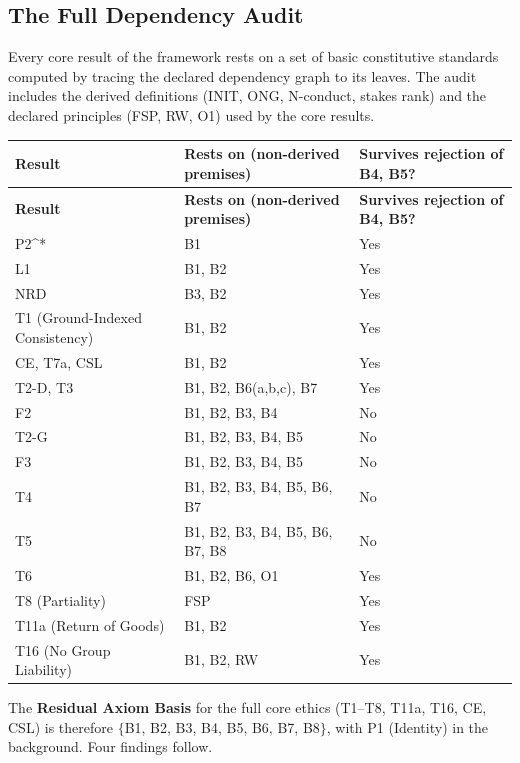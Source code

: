 \documentclass[11pt]{article}
\def\ensuremath#1{#1}%
\def\mathrm#1{#1}%
\newcommand{\Ptwo}{\texorpdfstring{\ensuremath{\mathrm{P2}^{*}}}{P2*}}
\begin{document}
\subsection{The Full Dependency Audit}\label{sec:rab:audit}
Every core result of the framework rests on a set of basic constitutive standards computed by tracing the declared dependency graph to its leaves. The audit includes the derived definitions (INIT, ONG, N-conduct, stakes rank) and the declared principles (FSP, RW, O1) used by the core results.
\begin{longtable}{@{}L{2.6cm} L{7.4cm} L{5.3cm}@{}}
\toprule
\textbf{Result} & \textbf{Rests on (non-derived premises)} & \textbf{Survives rejection of B4, B5?} \\
\midrule
\endfirsthead
\toprule
\textbf{Result} & \textbf{Rests on (non-derived premises)} & \textbf{Survives rejection of B4, B5?} \\
\midrule
\endhead
\bottomrule
\endfoot
\Ptwo{} & B1 & Yes \\
L1 & B1, B2 & Yes \\
NRD & B3, B2 & Yes \\
T1 (Ground-Indexed Consistency) & B1, B2 & Yes \\
CE, T7a, CSL & B1, B2 & Yes \\
T2-D, T3 & B1, B2, B6(a,b,c), B7 & Yes \\
F2 & B1, B2, B3, B4 & No \\
T2-G & B1, B2, B3, B4, B5 & No \\
F3 & B1, B2, B3, B4, B5 & No \\
T4 & B1, B2, B3, B4, B5, B6, B7 & No \\
T5 & B1, B2, B3, B4, B5, B6, B7, B8 & No \\
T6 & B1, B2, B6, O1 & Yes \\
T8 (Partiality) & FSP & Yes \\
T11a (Return of Goods) & B1, B2 & Yes \\
T16 (No Group Liability) & B1, B2, RW & Yes \\
\end{longtable}
The \textbf{Residual Axiom Basis} for the full core ethics (T1--T8, T11a, T16, CE, CSL) is therefore $\{$B1, B2, B3, B4, B5, B6, B7, B8$\}$, with P1 (Identity) in the background. Four findings follow.
\end{document}
